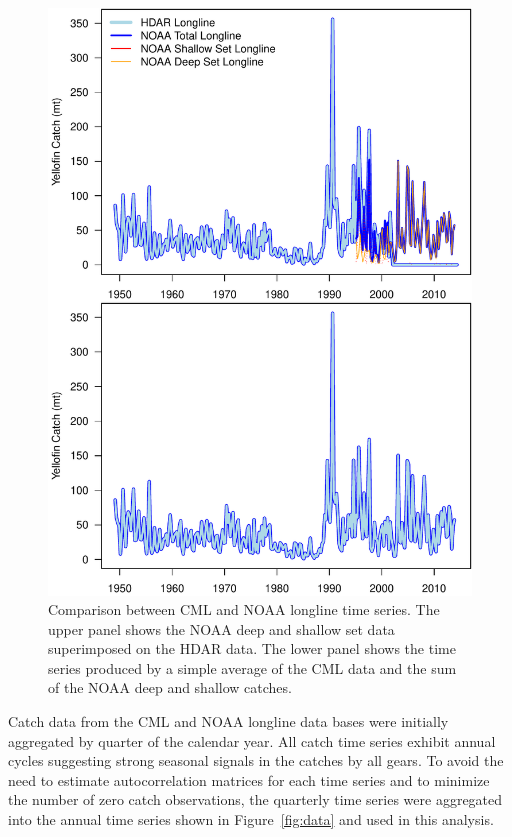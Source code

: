 \documentclass[12pt,letterpaper]{article}
\begin{document}
\begin{figure}
\begin{center}
\includegraphics[height=0.8\textheight]{./hdar_noaa_LL_ts.pdf}
\caption{\label{fig:hdarnoaaLLTS}
Comparison between CML and NOAA longline time series. The upper panel
shows the NOAA deep and shallow set data superimposed on the HDAR
data. The lower panel shows the time series produced by a simple
average of the CML data and the sum of the NOAA deep and shallow
catches.}
\end{center}
\end{figure}

Catch data from the CML and NOAA longline data bases were initially
aggregated by quarter of the calendar year.
All catch time series exhibit annual cycles suggesting strong seasonal
signals in the catches by all gears. To avoid the need to estimate
autocorrelation matrices for each time series and to minimize the
number of zero catch observations, the quarterly time series were
aggregated into the annual time series shown in Figure~\ref{fig:data}
and used in this analysis.
\end{document}
